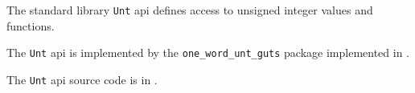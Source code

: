 
The standard library {\tt Unt} api defines access to unsigned integer values and functions.

The {\tt Unt} api is implemented by the {\tt one\_word\_unt\_guts} package implemented in 
.

The {\tt Unt} api source code is in .





